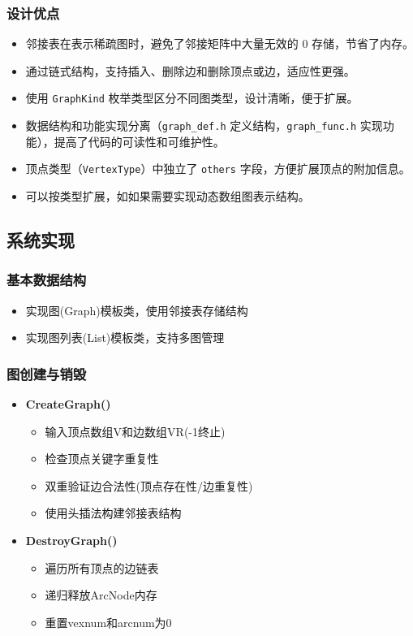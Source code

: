 \documentclass[supercite]{Experimental_Report}
\theoremstyle{definition}
\begin{document}
\subsubsection{设计优点}

\begin{itemize}

    \item 邻接表在表示稀疏图时，避免了邻接矩阵中大量无效的 0 存储，节省了内存。
    \item 通过链式结构，支持插入、删除边和删除顶点或边，适应性更强。
    \item 使用 \texttt{GraphKind} 枚举类型区分不同图类型，设计清晰，便于扩展。
    \item 数据结构和功能实现分离（\texttt{graph\_def.h} 定义结构，\texttt{graph\_func.h} 实现功能），提高了代码的可读性和可维护性。
    \item 顶点类型（\texttt{VertexType}）中独立了 \texttt{others} 字段，方便扩展顶点的附加信息。
    \item 可以按类型扩展，如如果需要实现动态数组图表示结构。

\end{itemize}


\subsection{系统实现}

\subsubsection*{基本数据结构}
\begin{itemize}
    \item 实现图(Graph)模板类，使用邻接表存储结构
    \item 实现图列表(List)模板类，支持多图管理
\end{itemize}

\subsubsection*{图创建与销毁}
\begin{itemize}
    \item \textbf{CreateGraph()}
    \begin{itemize}
        \item 输入顶点数组V和边数组VR(-1终止)
        \item 检查顶点关键字重复性
        \item 双重验证边合法性(顶点存在性/边重复性)
        \item 使用头插法构建邻接表结构
    \end{itemize}
    
    \item \textbf{DestroyGraph()}
    \begin{itemize}
        \item 遍历所有顶点的边链表
        \item 递归释放ArcNode内存
        \item 重置vexnum和arcnum为0
    \end{itemize}
\end{itemize}
\end{document}
